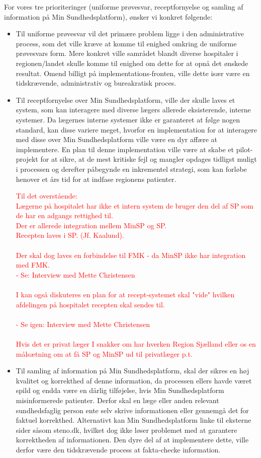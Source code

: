 For vores tre prioriteringer (uniforme prøvesvar, receptfornyelse og samling af information på Min Sundhedsplatform), ønsker vi konkret følgende:
\begin{itemize}
	\item Til uniforme prøvesvar vil det primære problem ligge i den administrative process, som det ville kræve at komme til enighed omkring de uniforme prøvesvars form. Mere konkret ville samrådet blandt diverse hospitaler i regionen/landet skulle komme til enighed om dette for at opnå det ønskede resultat. Omend billigt på implementations-fronten, ville dette især være en tidskrævende, administrativ og bureakratisk proces. 
	\item Til receptfornyelse over Min Sundhedsplatform, ville der skulle laves et system, som kan interagere med diverse lægers allerede eksisterende, interne systemer. Da lægernes interne systemer ikke er garanteret at følge nogen standard, kan disse variere meget, hvorfor en implementation for at interagere med disse over Min Sundhedsplatform ville være en dyr affære at implementere. En plan til denne implementation ville være at skabe et pilot-projekt for at sikre, at de mest kritiske fejl og mangler opdages tidligst muligt i processen og derefter påbegynde en inkrementel strategi, som kan forløbe henover et års tid for at indfase regionens patienter.   

\textcolor{red}{
	Til det overstående:\\	
	Lægerne på hospitalet har ikke et intern system de bruger den del af SP som de har en adgangs rettighed til. \\
	Der er allerede integration mellem MinSP og SP.\\
	Recepten laves i SP. (Jf. Kaalund).	\\
	\\
	Der skal dog laves en forbindelse til FMK - da MinSP ikke har integration med FMK.\\
	- Se: Interview med Mette Christensen \\
	\\
	I kan også diskuteres en plan for at recept-systemet skal "vide" hvilken afdelingen på hospitalet recepten skal sendes til.\\
	\\
	- Se igen: Interview med Mette Christensen\\
	\\
	Hvis det er privat læger I snakker om har hverken Region Sjælland eller os en målsætning om at få SP og MinSP ud til privatlæger p.t.\\
}
	\item Til samling af information på Min Sundhedsplatform, skal der sikres en høj kvalitet og korrekthed af denne information, da processen ellers havde været spild og endda være en dårlig tilføjelse, hvis Min Sundhedsplatform misinformerede patienter. Derfor skal en læge eller anden relevant sundhedsfaglig person ente selv skrive informationen eller gennemgå det for faktuel korrekthed. Alternativt kan Min Sundhedsplatform linke til eksterne sider såsom steno.dk, hvilket dog ikke løser problemet med at garantere korrektheden af informationen. Den dyre del af at implementere dette, ville derfor være den tidskrævende process at fakta-checke information. 
\end{itemize}

